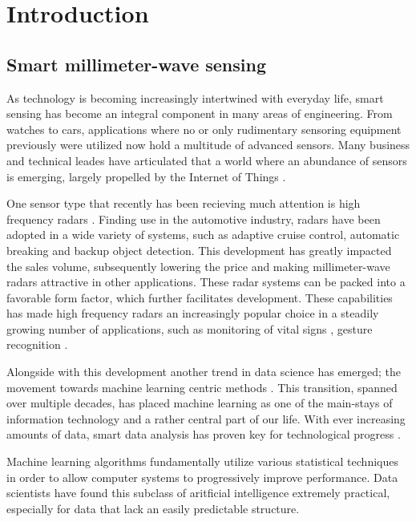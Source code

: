 \chapter{Introduction}

\section{Smart millimeter-wave sensing}

As technology is becoming increasingly intertwined with everyday life, smart sensing has become an integral component in many areas of engineering. From watches to cars, applications where no or only rudimentary sensoring equipment previously were utilized now hold a multitude of advanced sensors. Many business and technical leades have articulated that a world where an abundance of sensors is emerging, largely propelled by the Internet of Things \citep{bryzek_2013}. 

One sensor type that recently has been recieving much attention is high frequency radars \citep{frenzel_2018}. Finding use in the automotive industry, radars have been adopted in a wide variety of systems, such as adaptive cruise control, automatic breaking and backup object detection. This development has greatly impacted the sales volume, subsequently lowering the price and making millimeter-wave radars attractive in other applications. These radar systems can be packed into a favorable form factor, which further facilitates development. These capabilities has made high frequency radars an increasingly popular choice in a steadily growing number of applications, such as monitoring of vital signs \citep{kuo_lin_yu_lo_lyu_chou_chuang_2016}, gesture recognition \citep{lien_gillian_karagozler_amihood_schwesig_olson_raja_poupyrev_2016}.

Alongside with this development another trend in data science has emerged; the movement towards machine learning centric methods . This transition, spanned over multiple decades, has placed machine learning as one of the main-stays of information technology and a rather central part of our life. With ever increasing amounts of data, smart data analysis has proven key for technological progress \citep{a_smola_svn_vishwanathan_2010}.

Machine learning algorithms fundamentally utilize various statistical techniques in order to allow computer systems to progressively improve performance. Data scientists have found this subclass of aritficial intelligence extremely practical, especially for data that lack an easily predictable structure. 

